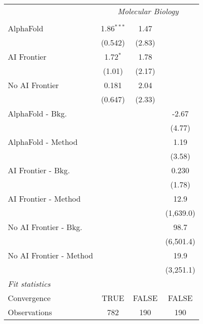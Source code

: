\begin{tabular}{lccc}
 & \multicolumn{3}{c}{\textit{Molecular Biology}} \\ \\
   AlphaFold               & 1.86$^{***}$ & 1.47   &   \\   
                           & (0.542)      & (2.83) &   \\   
   AI Frontier             & 1.72$^{*}$   & 1.78   &   \\   
                           & (1.01)       & (2.17) &   \\   
   No AI Frontier          & 0.181        & 2.04   &   \\   
                           & (0.647)      & (2.33) &   \\   
   AlphaFold - Bkg.        &              &        & -2.67\\   
                           &              &        & (4.77)\\   
   AlphaFold - Method      &              &        & 1.19\\   
                           &              &        & (3.58)\\   
   AI Frontier - Bkg.      &              &        & 0.230\\   
                           &              &        & (1.78)\\   
   AI Frontier - Method    &              &        & 12.9\\   
                           &              &        & (1,639.0)\\   
   No AI Frontier - Bkg.   &              &        & 98.7\\   
                           &              &        & (6,501.4)\\   
   No AI Frontier - Method &              &        & 19.9\\   
                           &              &        & (3,251.1)\\   
   \midrule
   \emph{Fit statistics}\\
   Convergence             &TRUE          & FALSE  & FALSE\\  
   Observations            & 782          & 190    & 190\\  
   

\end{tabular}
